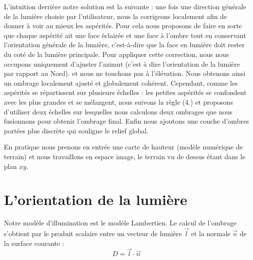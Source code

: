 L'intuition derrière notre solution est la suivante : une fois une direction générale de la lumière choisie par l'utilisateur, nous la corrigeons localement afin de donner à voir au mieux les aspérités. Pour cela nous proposons de faire en sorte que chaque aspérité ait une face éclairée et une face à l'ombre tout en conservant l'orientation générale de la lumière, c'est-à-dire que la face en lumière doit rester du coté de la lumière principale. Pour appliquer cette correction, nous nous occupons uniquement d'ajuster l'azimut (c'est à dire l'orientation de la lumière par rapport au Nord). et nous ne touchons pas à l'élévation. Nous obtenons ainsi un ombrage localement ajusté et globalement cohérent. 
Cependant, comme les aspérités se répartissent sur plusieurs échelles : les petites aspérités se confondent avec les plus grandes et se mélangent, nous suivons la règle (4.) et proposons d'utiliser deux échelles sur lesquelles nous calculons deux ombrages que nous fusionnons pour obtenir l'ombrage final. Enfin nous ajoutons une couche d'ombres portées plus discrète qui souligne le relief global.

En pratique nous prenons en entrée une carte de hauteur (modèle numérique de terrain) et nous travaillons en espace image, le terrain vu de dessus étant dans le plan $xy$.



\section{L'orientation de la lumière}



Notre modèle d'illumination est le modèle Lambertien. Le calcul de l'ombrage s'obtient par le produit scalaire entre un vecteur de lumière $\vec{l}$ et la normale $\vec{n}$ de la surface courante :
\begin{equation} 
D = \vec{l}\cdot{\vec{n}}\end{equation}

